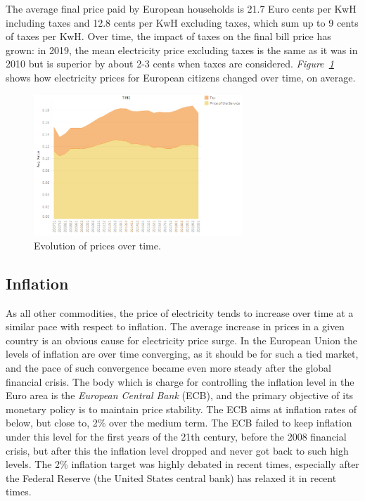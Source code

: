 \documentclass[a4paper,12pt]{book}
\begin{document}
The average final price paid by European households is 21.7 Euro cents per KwH including taxes and 12.8 cents per KwH excluding taxes, which sum up to 9 cents of taxes per KwH. Over time, the impact of taxes on the final bill price has grown: in 2019, the mean electricity price excluding taxes is the same as it was in 2010 but is superior by about 2-3 cents when taxes are considered. \textit{Figure~\ref{fig:TaxesTime}} shows how electricity prices for European citizens changed over time, on average.

\begin{figure}[tb]
\begin{center}
\captionsetup{justification=centering}
\includegraphics[width=0.7\textwidth]{Images/TaxesTime.png}
\caption{Evolution of prices over time. }
\label{fig:TaxesTime}
\end{center}
\end{figure}

\subsection{Inflation}

As all other commodities, the price of electricity tends to increase over time at a similar pace with respect to inflation. The average increase in prices in a given country is an obvious cause for electricity price surge. In the European Union the levels of inflation are over time converging, as it should be for such a tied market, and the pace of such convergence became even more steady after the global financial crisis. \cite{brovz2018dynamics} The body which is charge for controlling the inflation level in the Euro area is the \textit{European Central Bank} (ECB), and the primary objective of its monetary policy is to maintain price stability. The ECB aims at inflation rates of below, but close to, 2\% over the medium term. The ECB failed to keep inflation under this level for the first years of the 21th century, before the 2008 financial crisis, but after this the inflation level dropped and never got back to such high levels. The 2\% inflation target was highly debated in recent times, especially after the Federal Reserve (the United States central bank) has relaxed it in recent times.
\end{document}
